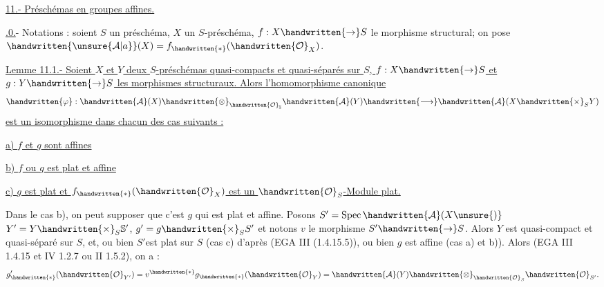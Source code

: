 \uline{11.- Préschémas en groupes affines.}

\uline{.0.}- Notations : soient $S$ un préschéma, $X$ un $S$-préschéma, $f:X\handwritten{\to}S$ le morphisme structural; on pose $\handwritten{\unsure{\mathcal{A}|a}}(X)=f_{\handwritten{*}}(\handwritten{\mathcal{O}}_X)$.

\uline{Lemme 11.1.- Soient $X$ et $Y$ deux $S$-préschémas quasi-compacts et quasi-séparés sur $S$, $f:X\handwritten{\to}S$ et $g:Y\handwritten{\to}S$ les morphismes structuraux. Alors l'homomorphisme canonique}
\[
\handwritten{\varphi}:\handwritten{\mathcal{A}}(X)\handwritten{\otimes}_{\handwritten{\mathcal{O}}_{\mathbb{S}}}\handwritten{\mathcal{A}}(Y)\handwritten{\longrightarrow}\handwritten{\mathcal{A}}(X\handwritten{\times}_S Y)
\]
\uline{est un isomorphisme dans chacun des cas suivants :}

\uline{a) $f$ et $g$ sont affines}

\uline{b) $f$ ou $g$ est plat et affine}

\uline{c) $g$ est plat et $f_{\handwritten{*}}(\handwritten{\mathcal{O}}_X)$ est un $\handwritten{\mathcal{O}}_S$-Module plat.}

Dans le cas b), on peut supposer que c'est $g$ qui est plat et affine. Posons $S'=\operatorname{Spec}\handwritten{\mathcal{A}}(X\unsure{)}$ $Y'=Y\handwritten{\times}_S\mathbb{S}'$, $g'=g\handwritten{\times}_S S'$ et notons $v$ le morphisme $S'\handwritten{\to}S$. Alors $Y$ est quasi-compact et quasi-séparé sur $S$, et, ou bien $S'$est plat sur $S$ (cas c) d'après (EGA III (1.4.15.5)), ou bien $g$ est affine (cas a) et b)). Alors (EGA III 1.4.15 et IV 1.2.7 ou II 1.5.2), on a :
\[
g'_{\handwritten{*}}(\handwritten{\mathcal{O}}_{Y'})=v^{\handwritten{*}}g_{\handwritten{*}}(\handwritten{\mathcal{O}}_Y)=\handwritten{\mathcal{A}}(Y)\handwritten{\otimes}_{\handwritten{\mathcal{O}}_S}\handwritten{\mathcal{O}}_{S'}.
\]

